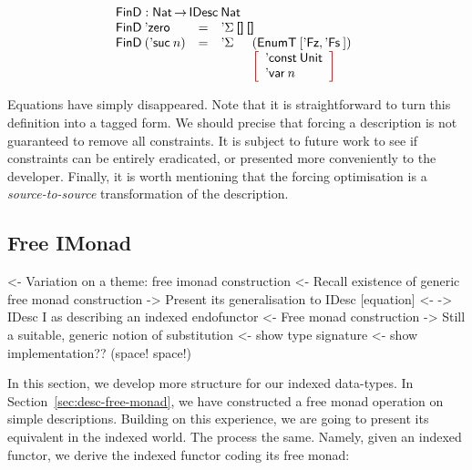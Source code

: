 \[\stk{
\FinD : \Nat \To \IDesc{\Nat} \\
\begin{array}{@{}llll}
\FinD\: \NatZero     & = & \multicolumn{2}{l}{\DSigma{\Void}{\Void} } \\
\FinD\: (\NatSuc{n}) & = & \DSigma{}{} & (\EnumT{[ \FinZero , \FinSuc{} ]}) \\
                     &   &             & \bigRedBracket{
                                         \begin{array}{l}
                                         \DConst{\Unit} \\
                                         \DVar{n}
                                         \end{array}
                                         }
\end{array}
}\]

Equations have simply disappeared. Note that it is straightforward to
turn this definition into a tagged form. We should precise that
forcing a description is not guaranteed to remove all constraints. It
is subject to future work to see if constraints can be entirely
eradicated, or presented more conveniently to the developer. Finally,
it is worth mentioning that the forcing optimisation is a
\emph{source-to-source} transformation of the description.

\subsection{Free IMonad}

\begin{wstructure}
<- Variation on a theme: free imonad construction
    <- Recall existence of generic free monad construction
    -> Present its generalisation to IDesc [equation]
        <- \I -> IDesc I as describing an indexed endofunctor
        <- Free monad construction
    -> Still a suitable, generic notion of substitution
        <- show type signature
        <- show implementation?? (space! space!)
\end{wstructure}

In this section, we develop more structure for our indexed
data-types. In Section~\ref{sec:desc-free-monad}, we have constructed
a free monad operation on simple descriptions. Building on this
experience, we are going to present its equivalent in the indexed
world. The process the same. Namely, given an indexed functor, we
derive the indexed functor coding its free monad:

